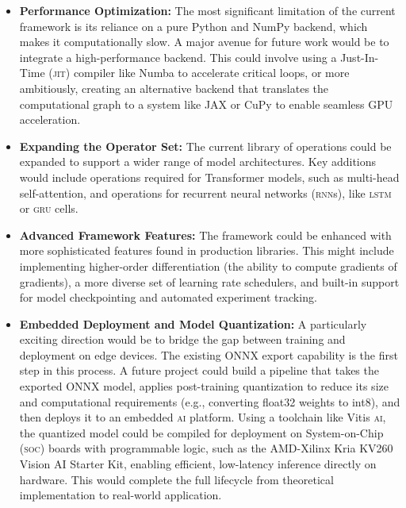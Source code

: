 \documentclass[a4paper]{article}
\newcommand{\acronym}[1]{\textsc{#1}}
\begin{document}
\begin{itemize}
    \item \textbf{Performance Optimization:} The most significant limitation of the current framework is its reliance on a pure Python and NumPy backend, which makes it computationally slow. A major avenue for future work would be to integrate a high-performance backend. This could involve using a Just-In-Time (\acronym{jit}) compiler like Numba to accelerate critical loops, or more ambitiously, creating an alternative backend that translates the computational graph to a system like JAX or CuPy to enable seamless GPU acceleration.

    \item \textbf{Expanding the Operator Set:} The current library of operations could be expanded to support a wider range of model architectures. Key additions would include operations required for Transformer models, such as multi-head self-attention, and operations for recurrent neural networks (\acronym{rnn}s), like \acronym{lstm} or \acronym{gru} cells.

    \item \textbf{Advanced Framework Features:} The framework could be enhanced with more sophisticated features found in production libraries. This might include implementing higher-order differentiation (the ability to compute gradients of gradients), a more diverse set of learning rate schedulers, and built-in support for model checkpointing and automated experiment tracking.

    \item \textbf{Embedded Deployment and Model Quantization:} A particularly exciting direction would be to bridge the gap between training and deployment on edge devices. The existing ONNX export capability is the first step in this process. A future project could build a pipeline that takes the exported ONNX model, applies post-training quantization to reduce its size and computational requirements (e.g., converting float32 weights to int8), and then deploys it to an embedded \acronym{ai} platform. Using a toolchain like Vitis \acronym{ai}, the quantized model could be compiled for deployment on System-on-Chip (\acronym{soc}) boards with programmable logic, such as the AMD-Xilinx Kria KV260 Vision AI Starter Kit, enabling efficient, low-latency inference directly on hardware. This would complete the full lifecycle from theoretical implementation to real-world application.
\end{itemize}
\end{document}
